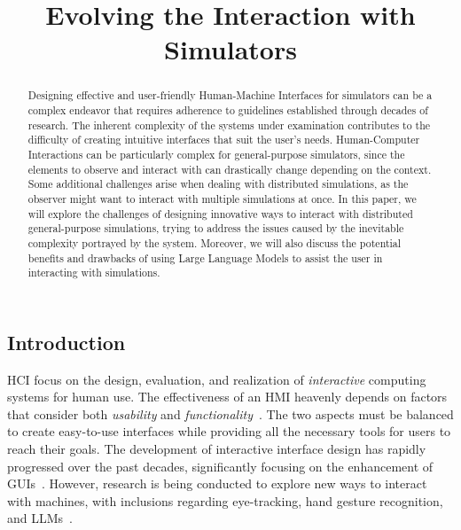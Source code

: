 \documentclass[conference]{IEEEtran}
\begin{document}
\title{Evolving the Interaction with Simulators\\
}

\author{
}

\maketitle

\begin{abstract}
    Designing effective and user-friendly Human-Machine Interfaces for simulators can be a complex endeavor that requires adherence to guidelines
    established through decades of research.
    The inherent complexity of the systems under examination contributes to the difficulty of creating intuitive interfaces that suit the user's needs.
    Human-Computer Interactions can be particularly complex for general-purpose simulators,
    since the elements to observe and interact with can drastically change depending on the context.
    Some additional challenges arise when dealing with distributed simulations,
    as the observer might want to interact with multiple simulations at once.
    In this paper,
    we will explore the challenges of designing innovative ways to interact with distributed general-purpose simulations,
    trying to address the issues caused by the inevitable complexity portrayed by the system.
    Moreover,
    we will also discuss the potential benefits and drawbacks of using Large Language Models to assist the user in interacting with simulations.
\end{abstract}


\subsection{Introduction}
\ac{HCI} focus on the design,
evaluation,
and realization of \emph{interactive} computing systems for human use.
The effectiveness of an \ac{HMI} heavenly depends on factors that consider both \emph{usability} and \emph{functionality}~\cite{Sinha2010}.
%
The two aspects must be balanced to create easy-to-use interfaces
while providing all the necessary tools for users to reach their goals.
%
The development of interactive interface design has rapidly progressed over the past decades,
significantly focusing on the enhancement of \acp{GUI}~\cite{Murad2019}.
%
However,
research is being conducted to explore new ways to interact with machines,
with inclusions regarding eye-tracking,
hand gesture recognition,
and \acp{LLM}~\cite{Poole2006, Sarma2021, kapania2024imcategorizingllmproductivity}.
\end{document}
